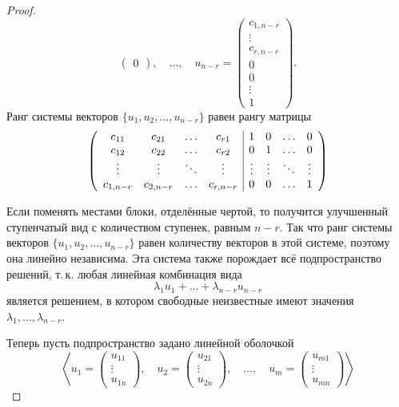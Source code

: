 \begin{proof}
\[\begin{pmatrix}
            0
        \end{pmatrix},\quad\ldots,\quad
        u_{n - r} = 
        \begin{pmatrix}
            c_{1, n - r}\\
            \vdots\\
            c_{r, n - r}\\
            0\\
            0\\
            \vdots\\
            1
        \end{pmatrix}.
    \]
    Ранг системы векторов $\{u_1, u_2, \ldots, u_{n - r}\}$ равен рангу матрицы
    \[
        \left(
            \begin{array}{c c c c | c c c c}
                c_{11} & c_{21} & \ldots & c_{r1} & 1 & 0 & \ldots & 0\\
                c_{12} & c_{22} & \ldots & c_{r2} & 0 & 1 & \ldots & 0\\
                \vdots & \vdots & \ddots & \vdots & \vdots & \vdots & \ddots & \vdots\\
                c_{1, n - r} & c_{2, n - r} & \ldots & c_{r, n - r} & 0 & 0 & \ldots & 1
            \end{array}
        \right)
    \]

    Если поменять местами блоки, отделённые чертой, то получится улучшенный ступенчатый вид с количеством ступенек, равным $n - r$. Так что ранг системы векторов $\{u_1, u_2, \ldots, u_{n - r}\}$ равен количеству векторов в этой системе, поэтому она линейно независима. Эта система также порождает всё подпространство решений, т.\,к. любая линейная комбинация вида
    \[
        \lambda_1u_1 + \ldots + \lambda_{n - r}u_{n - r}
    \]
    является решением, в котором свободные неизвестные имеют значения $\lambda_1, \ldots, \lambda_{n - r}$.

    Теперь пусть подпространство задано линейной оболочкой
    \[
        \left\langle
        u_1 = 
        \begin{pmatrix}
            u_{11}\\
            \vdots\\
            u_{1n}
        \end{pmatrix},\quad
        u_2 = 
        \begin{pmatrix}
            u_{21}\\
            \vdots\\
            u_{2n}
        \end{pmatrix},\quad\ldots,\quad
        u_m = 
        \begin{pmatrix}
            u_{m1}\\
            \vdots\\
            u_{mn}
        \end{pmatrix}
        \right\rangle
    \]


\end{proof}
